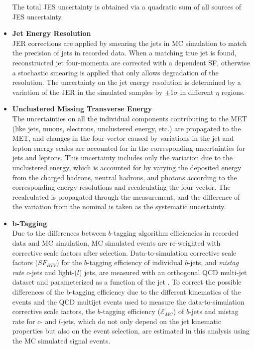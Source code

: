 \begin{itemize}
    The total JES uncertainty is obtained via a quadratic sum of all sources of JES uncertainty.
    \item {\bf Jet Energy Resolution} \\
    JER corrections are applied by smearing the jets in MC simulation to match the precision of jets in recorded data.
    When a matching true jet is found, reconstructed jet four-momenta are corrected with a \pT dependent SF, otherwise a stochastic smearing is applied that only allows degradation of the resolution.
    The uncertainty on the jet energy resolution is determined by a variation of the JER in the simulated samples by $\pm 1\sigma$ in different $\eta$ regions.
    \item {\bf Unclustered Missing Transverse Energy} \\
    The uncertainties on all the individual components contributing to the MET (like jets, muons, electrons, unclustered energy, etc.) are propagated to the MET, and changes in the \ETmiss four-vector caused by variations in the jet and lepton energy scales are accounted for in the corresponding uncertainties for jets and leptons.
    This uncertainty includes only the variation due to the unclustered energy, which is accounted for by varying the deposited energy from the charged hadrons, neutral hadrons, and photons according to the corresponding energy resolutions and recalculating the \ETmiss four-vector. 
    The recalculated \ETmiss is propagated through the measurement, and the difference of the variation from the nominal is taken as the systematic uncertainty.
    \item {\bf b-Tagging} \\
    Due to the differences between $b$-tagging algorithm efficiencies in recorded data and MC simulation, MC simulated events are re-weighted with corrective scale factors after selection.
    Data-to-simulation corrective scale factors ($SF_{BTV}$) for the $b$-tagging efficiency of individual $b$-jets, and \textit{mistag rate} $c$-jets and light-($l$) jets, are measured with an orthogonal QCD multi-jet dataset and parameterized as a function of the jet \pT.
    To correct the possible differences of the b-tagging efficiency due to the different kinematics of the \ttbar events and the QCD multijet events used to measure the data-to-simulation corrective scale factors, the $b$-tagging efficiency ($\mathcal{E}_{MC}$) of $b$-jets and mistag rate for $c$- and $l$-jets, which do not only depend on the jet kinematic properties but also on the event selection, are estimated in this analysis using the MC simulated \ttbar signal events.

\end{itemize}
